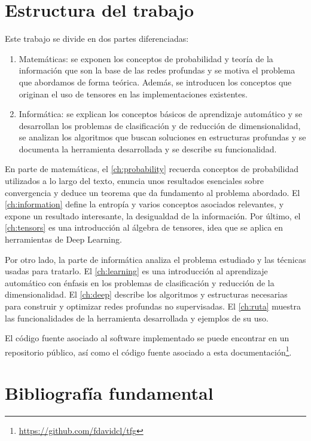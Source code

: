 \section{Estructura del trabajo}

Este trabajo se divide en dos partes diferenciadas:
\begin{enumerate}
\item Matemáticas: se exponen los conceptos de probabilidad y teoría de la información que son la base de las redes profundas y se motiva el problema que abordamos de forma teórica. Además, se introducen los conceptos que originan el uso de tensores en las implementaciones existentes.
\item Informática: se explican los conceptos básicos de aprendizaje automático y se desarrollan los problemas de clasificación y de reducción de dimensionalidad, se analizan los algoritmos que buscan soluciones en estructuras profundas y se documenta la herramienta desarrollada y se describe su funcionalidad.
\end{enumerate}

En parte de matemáticas, el \autoref{ch:probability} recuerda conceptos de probabilidad utilizados a lo largo del texto, enuncia unos resultados esenciales sobre convergencia y deduce un teorema que da fundamento al problema abordado. El \autoref{ch:information} define la entropía y varios conceptos asociados relevantes, y expone un resultado interesante, la desigualdad de la información. Por último, el \autoref{ch:tensors} es una introducción al álgebra de tensores, idea que se aplica en herramientas de Deep Learning.

Por otro lado, la parte de informática analiza el problema estudiado y las técnicas usadas para tratarlo. El \autoref{ch:learning} es una introducción al aprendizaje automático con énfasis en los problemas de clasificación y reducción de la dimensionalidad. El \autoref{ch:deep} describe los algoritmos y estructuras necesarias para construir y optimizar redes profundas no supervisadas. El \autoref{ch:ruta} muestra las funcionalidades de la herramienta desarrollada y ejemplos de su uso.

El código fuente asociado al software implementado se puede encontrar en un repositorio público, así como el código fuente asociado a esta documentación\footnote{\url{https://github.com/fdavidcl/tfg}}.

\section{Bibliografía fundamental}

